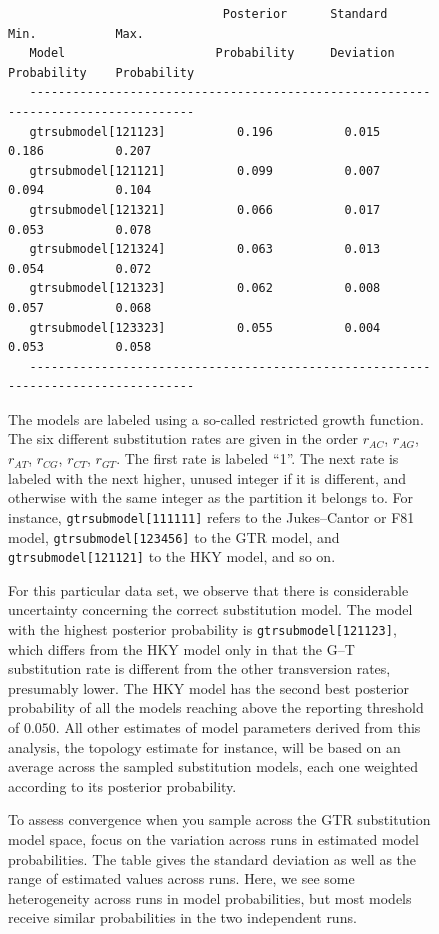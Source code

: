 \documentclass[12pt]{book}
\newcommand{\ttt}[1]{\texttt{#1}}
\begin{document}
\begin{figure}[h]
\begin{singlespacing}
\begin{verbatim}
                              Posterior      Standard         Min.           Max.   
   Model                     Probability     Deviation     Probability    Probability
   ----------------------------------------------------------------------------------
   gtrsubmodel[121123]          0.196          0.015          0.186          0.207
   gtrsubmodel[121121]          0.099          0.007          0.094          0.104
   gtrsubmodel[121321]          0.066          0.017          0.053          0.078
   gtrsubmodel[121324]          0.063          0.013          0.054          0.072
   gtrsubmodel[121323]          0.062          0.008          0.057          0.068
   gtrsubmodel[123323]          0.055          0.004          0.053          0.058
   ----------------------------------------------------------------------------------
\end{verbatim}
\end{singlespacing}
\normalsize

The models are labeled using a so-called restricted growth function. The six different substitution
rates are given in the order $r_{AC}$, $r_{AG}$, $r_{AT}$, $r_{CG}$, $r_{CT}$, $r_{GT}$. The first rate is
labeled ``1''. The next rate is labeled with the next higher, unused integer if it is different,
and otherwise with the same integer as the partition it belongs to. For instance,
\ttt{gtrsubmodel[111111]} refers to the Jukes--Cantor or F81 model, \ttt{gtrsubmodel[123456]} to
the GTR model, and \ttt{gtrsubmodel[121121]} to the HKY model, and so on.

For this particular data set, we observe that there is considerable uncertainty concerning the
correct substitution model. The model with the highest posterior probability is
\ttt{gtrsubmodel[121123]}, which differs from the HKY model only in that the G--T substitution rate
is different from the other transversion rates, presumably lower. The HKY model has the second best
posterior probability of all the models reaching above the reporting threshold of $0.050$. All other
estimates of model parameters derived from this analysis, the topology estimate for instance, will
be based on an average across the sampled substitution models, each one weighted according to its
posterior probability.

To assess convergence when you sample across the GTR substitution model space, focus on the
variation across runs in estimated model probabilities. The table gives the standard deviation as
well as the range of estimated values across runs. Here, we see some heterogeneity across runs in
model probabilities, but most models receive similar probabilities in the two independent runs.



\end{figure}
\end{document}
